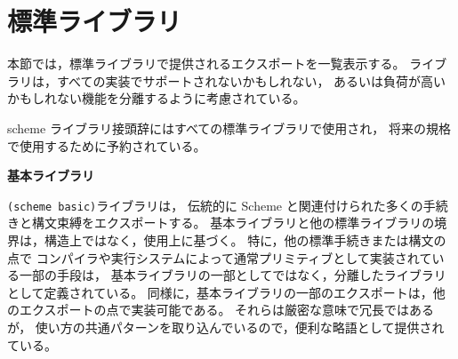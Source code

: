 \chapter{標準ライブラリ}
\label{stdlibraries}


本節では，標準ライブラリで提供されるエクスポートを一覧表示する。
ライブラリは，すべての実装でサポートされないかもしれない，
あるいは負荷が高いかもしれない機能を分離するように考慮されている。

{\cf scheme} ライブラリ接頭辞にはすべての標準ライブラリで使用され，
将来の規格で使用するために予約されている。

\textbf{基本ライブラリ}

\texttt{(scheme basic)}ライブラリは，
伝統的に Scheme と関連付けられた多くの手続きと構文束縛をエクスポートする。
基本ライブラリと他の標準ライブラリの境界は，構造上ではなく，使用上に基づく。
特に，他の標準手続きまたは構文の点で
コンパイラや実行システムによって通常プリミティブとして実装されている一部の手段は，
基本ライブラリの一部としてではなく，分離したライブラリとして定義されている。
同様に，基本ライブラリの一部のエクスポートは，他のエクスポートの点で実装可能である。
それらは厳密な意味で冗長ではあるが，
使い方の共通パターンを取り込んでいるので，便利な略語として提供されている。

